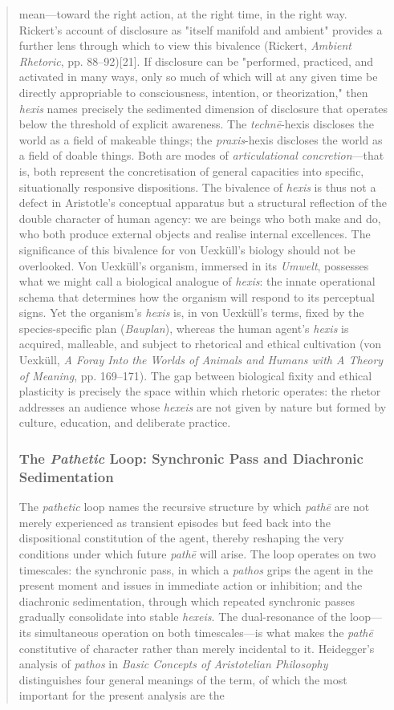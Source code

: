 \documentclass{article}
\begin{document}
\begin{quote}
mean---toward the right action, at the right time, in the right way. Rickert's account of disclosure as "itself manifold and ambient" provides a further lens through which to view this bivalence (Rickert, \textit{Ambient Rhetoric}, pp. 88--92)[21]. If disclosure can be "performed, practiced, and activated in many ways, only so much of which will at any given time be directly appropriable to consciousness, intention, or theorization," then \textit{hexis} names precisely the sedimented dimension of disclosure that operates below the threshold of explicit awareness. The \textit{technē}-hexis discloses the world as a field of makeable things; the \textit{praxis}-hexis discloses the world as a field of doable things. Both are modes of \textit{articulational concretion}---that is, both represent the concretisation of general capacities into specific, situationally responsive dispositions. The bivalence of \textit{hexis} is thus not a defect in Aristotle's conceptual apparatus but a structural reflection of the double character of human agency: we are beings who both make and do, who both produce external objects and realise internal excellences. The significance of this bivalence for von Uexküll's biology should not be overlooked. Von Uexküll's organism, immersed in its \textit{Umwelt}, possesses what we might call a biological analogue of \textit{hexis}: the innate operational schema that determines how the organism will respond to its perceptual signs. Yet the organism's \textit{hexis} is, in von Uexküll's terms, fixed by the species-specific plan (\textit{Bauplan}), whereas the human agent's \textit{hexis} is acquired, malleable, and subject to rhetorical and ethical cultivation (von Uexküll, \textit{A Foray Into the Worlds of Animals and Humans with A Theory of Meaning}, pp. 169--171). The gap between biological fixity and ethical plasticity is precisely the space within which rhetoric operates: the rhetor addresses an audience whose \textit{hexeis} are not given by nature but formed by culture, education, and deliberate practice. \subsubsection*{The \textit{Pathetic} Loop: Synchronic Pass and Diachronic Sedimentation} The \textit{pathetic} loop names the recursive structure by which \textit{pathē} are not merely experienced as transient episodes but feed back into the dispositional constitution of the agent, thereby reshaping the very conditions under which future \textit{pathē} will arise. The loop operates on two timescales: the synchronic pass, in which a \textit{pathos} grips the agent in the present moment and issues in immediate action or inhibition; and the diachronic sedimentation, through which repeated synchronic passes gradually consolidate into stable \textit{hexeis}. The dual-resonance of the loop---its simultaneous operation on both timescales---is what makes the \textit{pathē} constitutive of character rather than merely incidental to it. Heidegger's analysis of \textit{pathos} in \textit{Basic Concepts of Aristotelian Philosophy} distinguishes four general meanings of the term, of which the most important for the present analysis are the 
\end{quote}
\end{document}
